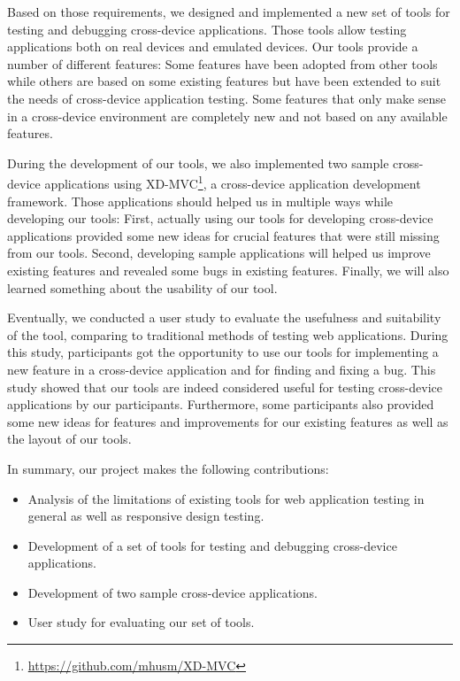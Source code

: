 Based on those requirements, we designed and implemented a new set of tools for testing and debugging cross-device applications. Those tools allow testing applications both on real devices and emulated devices. Our tools provide a number of different features: Some features have been adopted from other tools while others are based on some existing features but have been extended to suit the needs of cross-device application testing. Some features that only make sense in a cross-device environment are completely new and not based on any available features.

During the development of our tools, we also implemented two sample cross-device applications using XD-MVC\footnote{\url{https://github.com/mhusm/XD-MVC}}, a cross-device application development framework. Those applications should helped us in multiple ways while developing our tools: First, actually using our tools for developing cross-device applications provided some new ideas for crucial features that were still missing from our tools. Second, developing sample applications will helped us improve existing features and revealed some bugs in existing features. Finally, we will also learned something about the usability of our tool.

Eventually, we conducted a user study to evaluate the usefulness and suitability of the tool, comparing to traditional methods of testing web applications. During this study, participants got the opportunity to use our tools for implementing a new feature in a cross-device application and for finding and fixing a bug. This study showed that our tools are indeed considered useful for testing cross-device applications by our participants. Furthermore, some participants also provided some new ideas for features and improvements for our existing features as well as the layout of our tools.

In summary, our project makes the following contributions:
\begin{itemize}
	\item Analysis of the limitations of existing tools for web application testing in general as well as responsive design testing.
	\item Development of a set of tools for testing and debugging cross-device applications.
	\item Development of two sample cross-device applications.
	\item User study for evaluating our set of tools.
\end{itemize}


